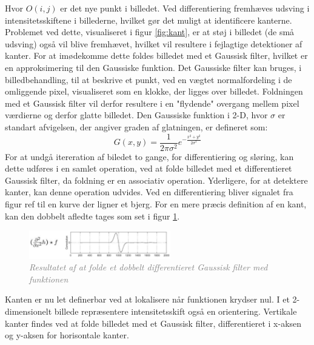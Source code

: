 Hvor $O(i,j)$ er det nye punkt i billedet. Ved differentiering fremhæves udsving i intensitetsskiftene i billederne, hvilket gør det muligt at identificere kanterne. Problemet ved dette, visualiseret i figur \ref{fig:kant}, er at støj i billedet (de små udsving) også vil blive fremhævet, hvilket vil resultere i fejlagtige detektioner af kanter. For at imødekomme dette foldes billedet med et Gaussisk filter, hvilket er en approksimering til den Gaussiske funktion. Det Gaussiske filter kan bruges, i billedbehandling, til at beskrive et punkt, ved en vægtet normalfordeling i de omliggende pixel, visualiseret som en klokke, der ligges over billedet. Foldningen med et Gaussisk filter vil derfor resultere i en "flydende" overgang mellem pixel værdierne og derfor glatte billedet.  Den Gaussiske funktion i 2-D, hvor $ \sigma $ er standart afvigelsen, der angiver graden af glatningen, er defineret som:
\begin{equation}
G(x,y) = \frac{1}{2 \pi \sigma ^{2}} e^{- \frac{x^{2} + y^{2}}{2 \sigma ^{2}}}
\label{2dgaussian}
\end{equation} 
For at undgå itereration af biledet to gange, for differentiering og sløring, kan dette udføres i en samlet operation, ved at folde billedet med et differentieret Gaussisk filter, da foldning er en associativ operation. Yderligere, for at detektere kanter, kan denne operation udvides. Ved en differentiering bliver signalet fra figur ref til en kurve der ligner et bjerg. For en mere præcis definition af en kant, kan den dobbelt afledte tages som set i figur \ref{fig:deriv}.
\begin{figure}[H]
    \centering
    \includegraphics[width=0.55\textwidth]{fig/8.png}
    \vspace{-1em}   
    \begin{center}
    \caption{\textcolor{gray}{\footnotesize \textit{
     Resultatet af at folde et dobbelt differentieret Gaussisk filter med funktionen}}}
    \label{fig:deriv}
     \end{center}
    \vspace{-2.5em}  
  \end{figure}
\noindent
Kanten er nu let definerbar ved at lokalisere når funktionen krydser nul. I et 2-dimensionelt billede repræsentere intensitetsskift også en orientering. Vertikale kanter findes ved at folde billedet med et Gaussisk filter, differentieret i x-aksen og y-aksen for horisontale kanter.

